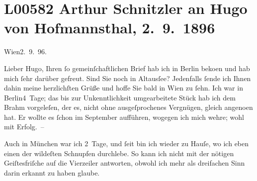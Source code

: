 

\section[Arthur Schnitzler an Hugo von Hofmannsthal, 2. 9. 1896]{L00582 Arthur Schnitzler an Hugo von Hofmannsthal, 2. 9. 1896}
\nopagebreak{}
\rehead{ }\normalsize\beginnumbering{}
\toendnotes[C]{\smallbreak\pagebreak[2]}
\toendnotes[C]{\smallbreak}
\pstart
           \raggedleft{}{\pb}Wien2. 9. 96.\pend
           
\pstart{}Lieber Hugo,\pend\vspace{0.5em}
\pstart
           Ihren ſo gemeinſchaftlichen
               Brief hab ich in Berlin beko{\geminationm}en und hab mich ſehr darüber gefreut. Sind Sie noch in
                  Altausſee? Jedenfalls ſende ich Ihnen dahin
               meine herzlichſten Grüße und hoffe Sie bald in Wien zu ſehn. Ich war in Berlin4 Tage; das bis zur Unkenntlichkeit umgearbeitete Stück hab ich dem Brahm vorgeleſen, der es, nicht ohne
               ausgeſprochenes Vergnügen, gleich angeno{\geminationm}en hat. Er
               wollte es ſchon im September aufführen, wogegen ich mich wehre; wohl mit
               Erfolg. –\pend
           
\pstart
           Auch in München war ich 2 Tage, und ſeit
                  \label{K_L00582-1v}\label{K_L00582-1} bin ich wieder zu Hauſe, wo ich eben einen {\pb}der
               wildeſten Schnupfen durchlebe. So kann ich nicht mit der nötigen Geiſtesfriſche auf
               die Vierzeiler antworten, obwohl ich mehr als dreifachen Sinn darin erkannt zu haben
               glaube.\pend
           
